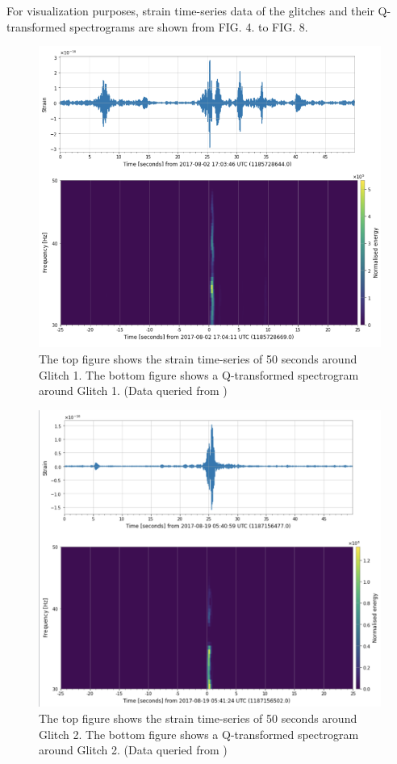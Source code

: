 \documentclass[preprint,
letterpaper,
 amsmath,amssymb,
 aps,
]{revtex4-2}
\begin{document}
For visualization purposes, strain time-series data of the glitches and their Q-transformed spectrograms are shown from FIG. 4. to FIG. 8.
\begin{figure}[t]
\caption{The top figure shows the strain time-series of 50 seconds around Glitch 1. The bottom figure shows a Q-transformed spectrogram around Glitch 1. (Data queried from \cite{collaboration2019open})}
\includegraphics[scale = .6]{loud 69 graphics.png}
\centering
\end{figure} 
\begin{figure}[t]
\caption{The top figure shows the strain time-series of 50 seconds around Glitch 2. The bottom figure shows a Q-transformed spectrogram around Glitch 2. (Data queried from \cite{collaboration2019open})}
\includegraphics[scale = .45]{loud 02 graphics.png}
\centering
\end{figure} 
\end{document}
